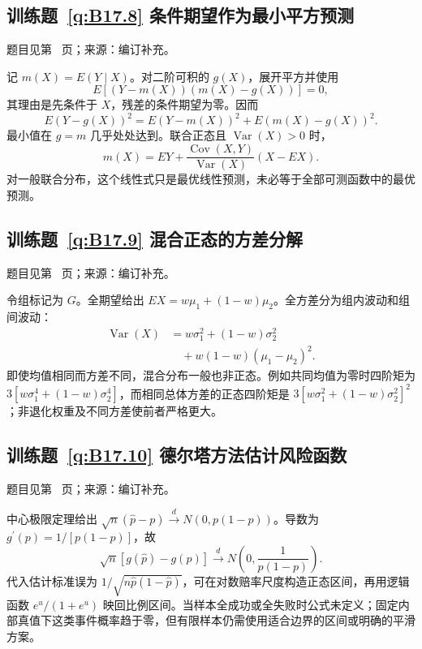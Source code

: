 \documentclass[UTF8,12pt,a4paper,fontset=fandol]{ctexbook}
\begin{document}
\subsection*{训练题~\ref{q:B17.8} 条件期望作为最小平方预测}\label{a:B17.8}{\small 题目见第~\pageref{q:B17.8} 页；来源：编订补充。}
\begin{solve}记 $m(X)=E(Y\mid X)$。对二阶可积的 $g(X)$，展开平方并使用\[E[(Y-m(X))(m(X)-g(X))]=0,\]其理由是先条件于 $X$，残差的条件期望为零。因而\[E(Y-g(X))^2=E(Y-m(X))^2+E(m(X)-g(X))^2.\]最小值在 $g=m$ 几乎处处达到。联合正态且 $\operatorname{Var}(X)>0$ 时，\[m(X)=EY+\frac{\operatorname{Cov}(X,Y)}{\operatorname{Var}(X)}(X-EX).\]对一般联合分布，这个线性式只是最优线性预测，未必等于全部可测函数中的最优预测。\end{solve}

\subsection*{训练题~\ref{q:B17.9} 混合正态的方差分解}\label{a:B17.9}{\small 题目见第~\pageref{q:B17.9} 页；来源：编订补充。}
\begin{solve}令组标记为 $G$。全期望给出 $EX=w\mu_1+(1-w)\mu_2$。全方差分为组内波动和组间波动：\[\begin{aligned}\operatorname{Var}(X)&=w\sigma_1^2+(1-w)\sigma_2^2\\&\quad+w(1-w)(\mu_1-\mu_2)^2.\end{aligned}\]即使均值相同而方差不同，混合分布一般也非正态。例如共同均值为零时四阶矩为 $3[w\sigma_1^4+(1-w)\sigma_2^4]$，而相同总体方差的正态四阶矩是 $3[w\sigma_1^2+(1-w)\sigma_2^2]^2$；非退化权重及不同方差使前者严格更大。\end{solve}

\subsection*{训练题~\ref{q:B17.10} 德尔塔方法估计风险函数}\label{a:B17.10}{\small 题目见第~\pageref{q:B17.10} 页；来源：编订补充。}
\begin{solve}中心极限定理给出 $\sqrt n(\widehat p-p)\xrightarrow dN(0,p(1-p))$。导数为 $g^{\prime}(p)=1/[p(1-p)]$，故\[\sqrt n[g(\widehat p)-g(p)]\xrightarrow dN\left(0,\frac1{p(1-p)}\right).\]代入估计标准误为 $1/\sqrt{n\widehat p(1-\widehat p)}$，可在对数赔率尺度构造正态区间，再用逻辑函数 $e^u/(1+e^u)$ 映回比例区间。当样本全成功或全失败时公式未定义；固定内部真值下这类事件概率趋于零，但有限样本仍需使用适合边界的区间或明确的平滑方案。\end{solve}
\end{document}

